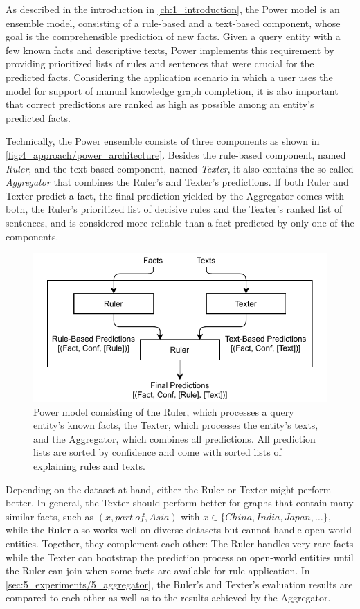 As described in the introduction in \autoref{ch:1_introduction}, the Power model is an ensemble model, consisting of a rule-based and a text-based component, whose goal is the comprehensible prediction of new facts. Given a query entity with a few known facts and descriptive texts, Power implements this requirement by providing prioritized lists of rules and sentences that were crucial for the predicted facts. Considering the application scenario in which a user uses the model for support of manual knowledge graph completion, it is also important that correct predictions are ranked as high as possible among an entity's predicted facts.

Technically, the Power ensemble consists of three components as shown in \autoref{fig:4_approach/power_architecture}. Besides the rule-based component, named \emph{Ruler}, and the text-based component, named \emph{Texter}, it also contains the so-called \emph{Aggregator} that combines the Ruler's and Texter's predictions. If both Ruler and Texter predict a fact, the final prediction yielded by the Aggregator comes with both, the Ruler's prioritized list of decisive rules and the Texter's ranked list of sentences, and is considered more reliable than a fact predicted by only one of the components.

\begin{figure}[t]
    \centering
    \includegraphics[width=\textwidth]{4_approach/power_architecture}
    \caption{Power model consisting of the Ruler, which processes a query entity's known facts, the Texter, which processes the entity's texts, and the Aggregator, which combines all predictions. All prediction lists are sorted by confidence and come with sorted lists of explaining rules and texts.}
    \label{fig:4_approach/power_architecture}
\end{figure}

Depending on the dataset at hand, either the Ruler or Texter might perform better. In general, the Texter should perform better for graphs that contain many similar facts, such as $(x, part~of, Asia)$ with $x \in \{China, India, Japan, \dots\}$, while the Ruler also works well on diverse datasets but cannot handle open-world entities. Together, they complement each other: The Ruler handles very rare facts while the Texter can bootstrap the prediction process on open-world entities until the Ruler can join when some facts are available for rule application. In \autoref{sec:5_experiments/5_aggregator}, the Ruler's and Texter's evaluation results are compared to each other as well as to the results achieved by the Aggregator.

